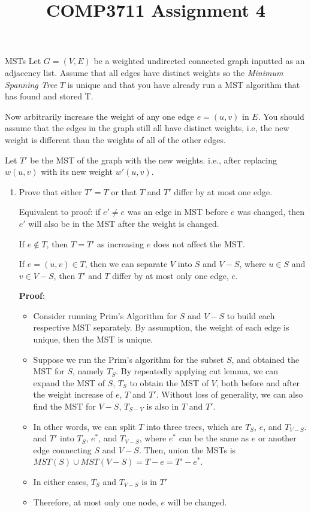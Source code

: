 \documentclass{article}
\title{COMP3711 Assignment 4}
\numberwithin{table}{section}
\numberwithin{figure}{section}
\begin{document}
\maketitle

\begin{section}{MSTs}
Let $G = (V, E)$ be a weighted undirected connected graph inputted as an adjacency list. Assume that all edges have distinct weights so the \textit{Minimum Spanning Tree} $T$ is unique and that you have already run a MST algorithm that has found and stored T.

Now arbitrarily increase the weight of any one edge $e = (u, v)$ in $E$. You should assume that the edges in the graph still all have distinct weights, i.e, the new weight is different than the weights of all of the other edges.

Let $T'$ be the MST of the graph with the new weights. i.e., after replacing $w(u, v)$ with its new weight $w'(u, v)$.

\begin{enumerate}
    \item Prove that either $T' = T$ or that $T$ and $T'$ differ by at most one edge.
    
    \begin{tcolorbox}[breakable]
    Equivalent to proof: if $e' \neq e$ was an edge in MST before $e$ was changed, then $e'$ will also be in the MST after the weight is changed.
    
    If $e \notin T$, then $T = T'$ as increasing $e$ does not affect the MST. 
    
    If $e = (u, v) \in T$, then we can separate $V$ into $S$ and $V-S$, where $u \in S$ and $v \in V-S$, then $T'$ and $T$ differ by at most only one edge, $e$.  
    
    \textbf{Proof}: 
    \begin{itemize}[noitemsep]
        \item Consider running Prim's Algorithm for $S$ and $V-S$ to build each respective MST separately. By assumption, the weight of each edge is unique, then the MST is unique.
        \item Suppose we run the Prim's algorithm for the subset $S$, and obtained the MST for $S$, namely $T_S$. By repeatedly applying cut lemma, we can expand the MST of $S$, $T_S$ to obtain the MST of $V$, both before and after the weight increase of $e$, $T$ and $T'$. Without loss of generality, we can also find the MST for $V-S$, $T_{S-V}$ is also in $T$ and $T'$. 
        \item In other words, we can split $T$ into three trees, which are $T_S$, $e$, and $T_{V-S}$. and $T'$ into $T_S$, $e^*$, and $T_{V-S}$, where $e^*$ can be the same as $e$ or another edge connecting $S$ and $V-S$. Then, union the MSTs is $MST(S) \cup MST(V-S) = T - e = T' - e^*$.
        \item In either cases, $T_S$ and $T_{V-S}$ is in $T'$
        \item Therefore, at most only one node, $e$ will be changed.
    \end{itemize}
    \end{tcolorbox}


\end{enumerate}
\end{section}
\end{document}
